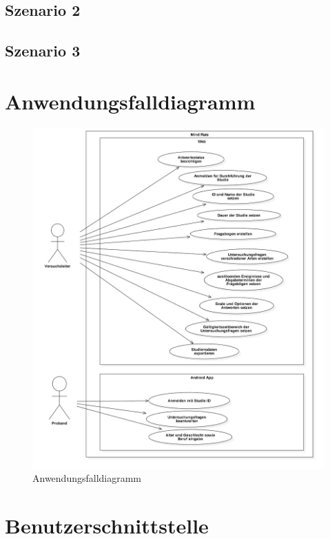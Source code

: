 \documentclass[a4paper]{scrreprt}
\begin{document}
            \subsection{Szenario 2}
            \subsection{Szenario 3}

        \newpage
        \section{Anwendungsfalldiagramm}
            \vspace*{2cm}
            \begin{figure}[htbp]
                \centering
                \includegraphics[scale = 0.35]{UseCaseDiagram1.jpg}
                \caption{Anwendungsfalldiagramm}
            \end{figure}

        \newpage
        \section{Benutzerschnittstelle}
\end{document}
